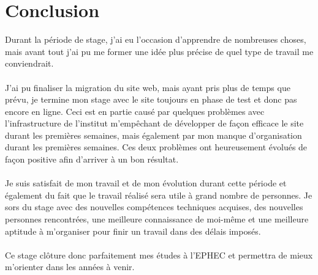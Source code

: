 \documentclass[11pt]{article}
\begin{document}
\newpage

\section{Conclusion}

Durant la période de stage, j'ai eu l'occasion d'apprendre de nombreuses choses, mais avant tout j'ai pu me former une idée plus précise de quel type de travail me conviendrait.\\
\\
J'ai pu finaliser la migration du site web, mais ayant pris plus de temps que prévu, je termine mon stage avec le site toujours en phase de test et donc pas encore en ligne.
Ceci est en partie causé par quelques problèmes avec l'infrastructure de l'institut m'empêchant de développer de façon efficace le site durant les premières semaines, mais également par mon manque d'organisation durant les premières semaines.
Ces deux problèmes ont heureusement évolués de façon positive afin d'arriver à un bon résultat.\\
\\
Je suis satisfait de mon travail et de mon évolution durant cette période et également du fait que le travail réalisé sera utile à grand nombre de personnes.
Je sors du stage avec des nouvelles compétences techniques acquises, des nouvelles personnes rencontrées, une meilleure connaissance de moi-même et une meilleure aptitude à m'organiser pour finir un travail dans des délais imposés.\\
\\
Ce stage clôture donc parfaitement mes études à l'EPHEC et permettra de mieux m'orienter dans les années à venir.
\end{document}
